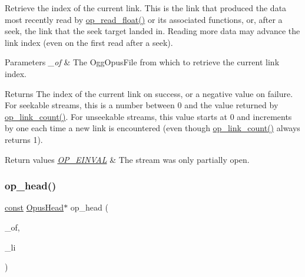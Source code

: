 Retrieve the index of the current link. This is the link that produced the data most recently read by \hyperlink{group__stream__decoding_ga73493002d84a234f5e19b70f1dddbe2a}{op\+\_\+read\+\_\+float()} or its associated functions, or, after a seek, the link that the seek target landed in. Reading more data may advance the link index (even on the first read after a seek). 
\begin{DoxyParams}{Parameters}
{\em \+\_\+of} & The {\ttfamily Ogg\+Opus\+File} from which to retrieve the current link index. \\
\hline
\end{DoxyParams}
\begin{DoxyReturn}{Returns}
The index of the current link on success, or a negative value on failure. For seekable streams, this is a number between 0 and the value returned by \hyperlink{group__stream__info_gaaf6ff40725a8bc7e73c9d396ab91837d}{op\+\_\+link\+\_\+count()}. For unseekable streams, this value starts at 0 and increments by one each time a new link is encountered (even though \hyperlink{group__stream__info_gaaf6ff40725a8bc7e73c9d396ab91837d}{op\+\_\+link\+\_\+count()} always returns 1). 
\end{DoxyReturn}

\begin{DoxyRetVals}{Return values}
{\em \hyperlink{group__error__codes_gae0879acafe9cc0ab72462d291fdb6fb6}{O\+P\+\_\+\+E\+I\+N\+V\+AL}} & The stream was only partially open. \\
\hline
\end{DoxyRetVals}
\mbox{\label{group__stream__info_gabae95dfa8a278a305213332e295443bb}} 
\subsubsection{\texorpdfstring{op\+\_\+head()}{op\_head()}}
{\footnotesize\ttfamily \hyperlink{zconf_8h_a2c212835823e3c54a8ab6d95c652660e}{const} \hyperlink{struct_opus_head}{Opus\+Head}$\ast$ op\+\_\+head (\begin{DoxyParamCaption}\item[{\hyperlink{zconf_8h_a2c212835823e3c54a8ab6d95c652660e}{const} Ogg\+Opus\+File $\ast$}]{\+\_\+of,  }\item[{int}]{\+\_\+li }\end{DoxyParamCaption})}

